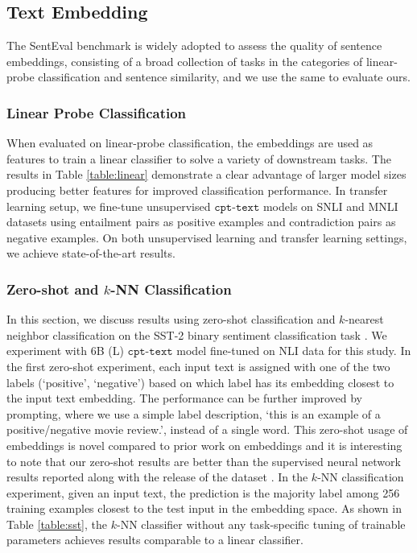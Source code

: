 \documentclass[nohyperref]{article}
\begin{document}
\subsection{Text Embedding}

The SentEval benchmark \cite{senteval} is widely adopted to assess the quality of sentence embeddings, consisting of a broad collection of tasks in the categories of linear-probe classification and sentence similarity, and we use the same to evaluate ours.


\subsubsection{Linear Probe Classification}
\label{sec:linear}

When evaluated on linear-probe classification, the embeddings are used as features to train a linear classifier to solve a variety of downstream tasks. The results in Table \ref{table:linear} demonstrate a clear advantage of larger model sizes producing better features for improved classification performance. In transfer learning setup, we fine-tune unsupervised $\texttt{cpt-text}$ models on SNLI \cite{snli} and MNLI \cite{mnli} datasets using entailment pairs as positive examples and contradiction pairs as negative examples. On both unsupervised learning and transfer learning settings, we achieve state-of-the-art results.


\subsubsection{Zero-shot and $k$-NN Classification}
\label{sec:zs}

In this section, we discuss results using zero-shot classification and $k$-nearest neighbor classification on the SST-2 binary sentiment classification task \cite{sst}. We experiment with 6B (L) $\texttt{cpt-text}$ model fine-tuned on NLI data for this study. In the first zero-shot experiment, each input text is assigned with one of the two labels (`positive', `negative') based on which label has its embedding closest to the input text embedding. The performance can be further improved by prompting, where we use a simple label description, `this is an example of a {positive/negative} movie review.', instead of a single word. This zero-shot usage of embeddings is novel compared to prior work on embeddings and it is interesting to note that our zero-shot results are better than the supervised neural network results reported along with the release of the dataset \cite{sst}. In the $k$-NN classification experiment, given an input text, the prediction is the majority label among 256 training examples closest to the test input in the embedding space. As shown in Table \ref{table:sst}, the $k$-NN classifier without any task-specific tuning of trainable parameters achieves results comparable to a linear classifier.
\end{document}
